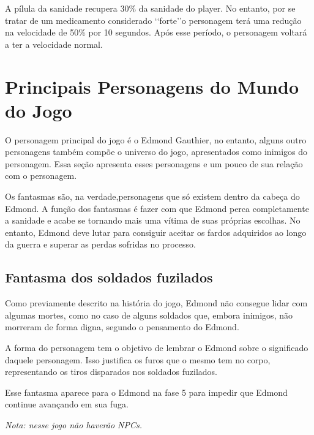 A  pílula da sanidade recupera 30\% da sanidade do player. No entanto, por se tratar de um medicamento considerado \lq\lq forte\rq\rq o personagem terá uma redução na velocidade de 50\% por 10 segundos. Após esse período, o personagem voltará a ter a velocidade normal.

\pagebreak
\section{\label{characters} Principais Personagens do Mundo do Jogo}
O personagem principal do jogo é o Edmond Gauthier, no entanto, alguns outro personagens também compõe o universo do jogo, apresentados como inimigos do personagem. Essa seção apresenta esses personagens e um pouco de sua relação com o personagem.

Os fantasmas são, na verdade,personagens que só existem dentro da cabeça do Edmond. A função dos fantasmas é fazer com que Edmond perca completamente a sanidade e acabe se tornando mais uma vítima de suas próprias escolhas. No entanto, Edmond deve lutar para consiguir aceitar os fardos adquiridos ao longo da guerra e superar as perdas sofridas no processo.

\subsection{Fantasma dos soldados fuzilados}
Como previamente descrito na história do jogo, Edmond não consegue lidar com algumas mortes, como no caso de alguns soldados que, embora inimigos, não morreram de forma digna, segundo o pensamento do Edmond. 
	
	A forma do personagem tem o objetivo de lembrar o Edmond sobre o significado daquele personagem. Isso justifica os furos que o mesmo tem no corpo, representando os tiros disparados nos soldados fuzilados. 
	
	Esse fantasma aparece para o Edmond na fase 5 para impedir que Edmond continue avançando em sua fuga.

\textit{Nota: nesse jogo não haverão NPCs.}